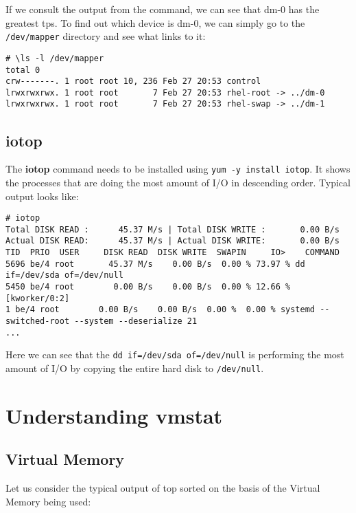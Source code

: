 If we consult the output from the command, we can see that dm-0 has the greatest tps. To find out which device is dm-0, we can simply go to the \verb|/dev/mapper| directory and see what links to it:

\vspace{-15pt}
\begin{verbatim}
# \ls -l /dev/mapper
total 0
crw-------. 1 root root 10, 236 Feb 27 20:53 control
lrwxrwxrwx. 1 root root       7 Feb 27 20:53 rhel-root -> ../dm-0
lrwxrwxrwx. 1 root root       7 Feb 27 20:53 rhel-swap -> ../dm-1
\end{verbatim}
\vspace{-10pt}	

\subsection{iotop}
The \textbf{iotop} command needs to be installed using \verb|yum -y install iotop|. It shows the processes that are doing the most amount of I/O in descending order. Typical output looks like:

\vspace{-15pt}
\begin{verbatim}
# iotop
Total DISK READ :      45.37 M/s | Total DISK WRITE :       0.00 B/s
Actual DISK READ:      45.37 M/s | Actual DISK WRITE:       0.00 B/s
TID  PRIO  USER     DISK READ  DISK WRITE  SWAPIN     IO>    COMMAND                                                       
5696 be/4 root       45.37 M/s    0.00 B/s  0.00 % 73.97 % dd if=/dev/sda of=/dev/null
5450 be/4 root        0.00 B/s    0.00 B/s  0.00 % 12.66 % [kworker/0:2]
1 be/4 root        0.00 B/s    0.00 B/s  0.00 %  0.00 % systemd --switched-root --system --deserialize 21
...
\end{verbatim}
\vspace{-10pt}	

\noindent
Here we can see that the \verb|dd if=/dev/sda of=/dev/null| is performing the most amount of I/O by copying the entire hard disk to \verb|/dev/null|. 

	\section{Understanding vmstat}
\subsection{Virtual Memory}
Let us consider the typical output of top sorted on the basis of the Virtual Memory being used:

